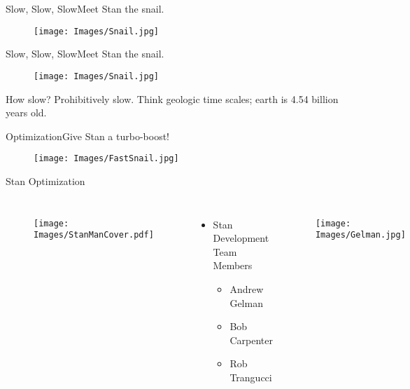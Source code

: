 \documentclass{beamer}
\begin{document}
\begin{frame}{Slow, Slow, Slow}{Meet Stan the snail.}
  \begin{figure}[H]
	\centering
	\texttt{[image: Images/Snail.jpg]}
	\end{figure}
	

\end{frame}

\begin{frame}{Slow, Slow, Slow}{Meet Stan the snail.}
  \begin{figure}[H]
	\centering
	\texttt{[image: Images/Snail.jpg]}
	\end{figure}

How slow? Prohibitively slow. Think geologic time scales; earth is 4.54 billion years old. 

\end{frame}

\begin{frame}{Optimization}{Give Stan a turbo-boost!}
  \begin{figure}[H]
	\centering
	\texttt{[image: Images/FastSnail.jpg]}
	\end{figure}
\end{frame}

\begin{frame}{Stan Optimization}{}
\begin{columns}
  \begin{figure}[H]
	\texttt{[image: Images/StanManCover.pdf]}
	\end{figure}
\begin{itemize}
\item Stan Development Team Members
      \begin{itemize}
      \item Andrew Gelman
      \item Bob Carpenter
      \item Rob Trangucci
      \end{itemize}
\end{itemize}


  \begin{figure}[H]
	\centering
	\texttt{[image: Images/Gelman.jpg]}
	\end{figure}
	
\end{columns}
\end{frame}
\end{document}
